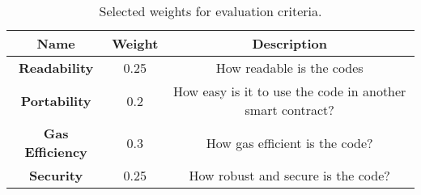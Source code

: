 \begin{table}[H]
	\centering
	\vspace*{-1ex}
	\caption{Selected weights for evaluation criteria.} 
	\scriptsize
	\vspace{-1ex}
	\begin{tabular}{|c|c|c|}
        \hline
        \textbf{Name} & \textbf{Weight}  & \textbf{Description}\\ \hline 
        \textbf{Readability} & 0.25 & How readable is the codes\\
        \textbf{Portability} & 0.2 & How easy is it to use the code in another smart contract? \\
        \textbf{Gas Efficiency} & 0.3 & How gas efficient is the code? \\
        \textbf{Security} & 0.25 & How robust and secure is the code? \\
        \hline
    \end{tabular}
    \label{table:weights}
\end{table}
